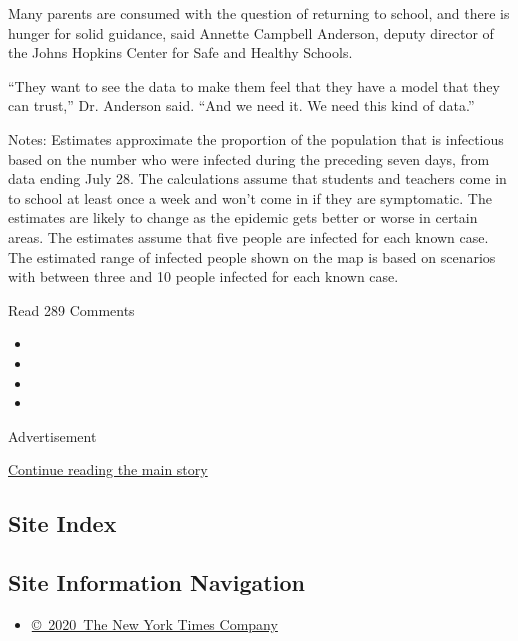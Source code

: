 Many parents are consumed with the question of returning to school, and
there is hunger for solid guidance, said Annette Campbell Anderson,
deputy director of the Johns Hopkins Center for Safe and Healthy
Schools.

``They want to see the data to make them feel that they have a model
that they can trust,'' Dr. Anderson said. ``And we need it. We need this
kind of data.''

Notes: Estimates approximate the proportion of the population that is
infectious based on the number who were infected during the preceding
seven days, from data ending July 28. The calculations assume that
students and teachers come in to school at least once a week and won't
come in if they are symptomatic. The estimates are likely to change as
the epidemic gets better or worse in certain areas. The estimates assume
that five people are infected for each known case. The estimated range
of infected people shown on the map is based on scenarios with between
three and 10 people infected for each known case.

Read 289 Comments

\begin{itemize}
\item
\item
\item
\item
\end{itemize}

Advertisement

\protect\hyperlink{after-bottom}{Continue reading the main story}

\hypertarget{site-index}{%
\subsection{Site Index}\label{site-index}}

\hypertarget{site-information-navigation}{%
\subsection{Site Information
Navigation}\label{site-information-navigation}}

\begin{itemize}
\tightlist
\item
  \href{https://help.nytimes.com/hc/en-us/articles/115014792127-Copyright-notice}{©~2020~The
  New York Times Company}
\end{itemize}

